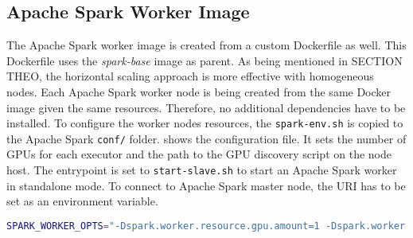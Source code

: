 \subsection{Apache Spark Worker Image}
The Apache Spark worker image is created from a custom Dockerfile as well.
%
This Dockerfile uses the \textit{spark-base} image as parent.
As being mentioned in SECTION THEO, the horizontal scaling approach is more effective with homogeneous nodes. Each Apache Spark worker node is being created from the same Docker image given the same resources.
%
Therefore, no additional dependencies have to be installed.
%
To configure the worker nodes resources, the \texttt{spark-env.sh} is copied to the Apache Spark \texttt{conf/} folder.  shows the configuration file. It sets the number of GPUs for each executor and the path to the GPU discovery script on the node host.
%
The entrypoint is set to \texttt{start-slave.sh} to start an Apache Spark worker in standalone mode. To connect to Apache Spark master node, the URI has to be set as an environment variable.
\begin{lstlisting}[label=lst:06_env_depl_worker-env, caption=Environment configuration for all worker nodes, language=sh]
SPARK_WORKER_OPTS="-Dspark.worker.resource.gpu.amount=1 -Dspark.worker.resource.gpu.discoveryScript=/opt/sparkRapidsPlugin/getGpusResources.sh"
\end{lstlisting}


